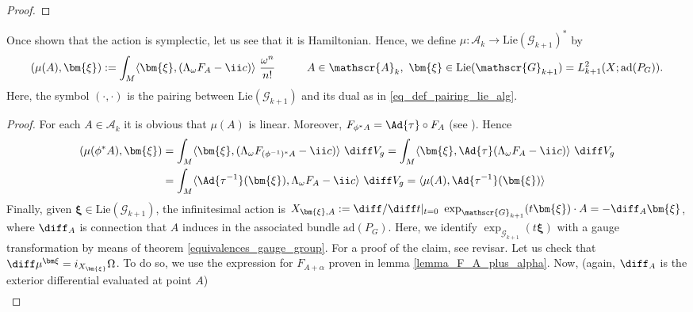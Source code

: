 {\begin{proof}
\end{proof}
Once shown that the action is symplectic, let us see that it is Hamiltonian. Hence, we define \(\mu \colon \mathscr{A}_k \to \mathrm{Lie}(\mathscr{G}_{k+1})^*\) by 
\begin{equation} \label{eq_def_moment_map}
 (\mu (A), \bm{\xi} ) :=\int_M \langle \bm{\xi}, (\Lambda_\omega F_A - \ii c) \rangle \  \frac{\omega^n}{n!} \hspace{1 cm} A \in \mathscr{A}_k, \ \bm{\xi}\in \mathrm{Lie}(\mathscr{G}_{k+1})=L^2_{k+1}(X; \mathrm{ad}(P_G)).
\end{equation}
Here, the symbol \((\cdot, \cdot) \) is the pairing between \(\mathrm{Lie}(\mathscr{G}_{k+1})\) and its dual as in \eqref{eq_def_pairing_lie_alg}.

\begin{proof}
    For each \(A \in \mathscr{A}_k\) it is obvious that \(\mu(A)\) is linear. Moreover, \(F_{\phi^*A}=\Ad{\tau}\circ F_A\) (see \parencite[Page 462]{Rudolph_2017pug}). Hence
    \begin{align*}
        (\mu(\phi^*A), \bm{\xi})  & = \int_M \langle \bm{\xi}, (\Lambda_\omega F_{(\phi^{-1})^*A}-\ii c) \rangle \ \diff V_g = \int_M \langle \bm{\xi}, \Ad{\tau}(\Lambda_\omega F_A- \ii c) \rangle \ \diff V_g \\
        & = \int_M \langle \Ad{\tau^{-1}} (\bm{\xi}), \Lambda_\omega F_A -\ii c \rangle \ \diff V_g = \langle \mu(A), \Ad{\tau^{-1}}(\bm{\xi}) \rangle 
    \end{align*}
    Finally, given \(\bm{\xi}\in \mathrm{Lie}(\mathscr{G}_{k+1})\), the infinitesimal action is \(X_{\bm{\xi}, A}:=\diff/\diff t|_{t=0} \ \exp_{\mathscr{G}_{k+1}}(t \bm{\xi})\cdot A=-\diff_A \bm{\xi}\), where \(\diff_A\) is connection that \(A\) induces in the associated bundle \(\mathrm{ad}(P_G)\). Here, we identify \(\exp_{\mathscr{G}_{k+1}}(t \bm{\xi})\) with a gauge transformation by means of theorem \ref{equivalences_gauge_group}. For a proof of the claim, see \parencite[Lemma 2.2]{trautwein2015surveygitpictureyangmills} {\color{red}revisar}. Let us check that \(\diff \mu^{\bm \xi}=i_{X_{\bm{\xi}}}\Omega\). To do so, we use the expression for \(F_{A+\alpha}\) proven in lemma \ref{lemma_F_A_plus_alpha}. Now, (again, \(\diff_A\) is the exterior differential evaluated at point \(A\))
    \begin{align*}

\end{align*}
\end{proof}}
